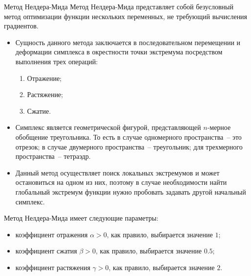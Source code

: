 \documentclass[aspectratio=169, mathserif]{beamer}	%
\begin{document}
\begin{frame}[fragile]{Метод Нелдера-Мида}
\scriptsize
Метод Нелдера-Мида представляет собой безусловный метод оптимизации функции нескольких переменных, не требующий вычисления градиентов.
\begin{itemize}
	\item Сущность данного метода заключается в последовательном перемещении и деформации симплекса в окрестности точки экстремума посредством выполнения трех операций:

\begin{enumerate}
	\scriptsize
	\item Отражение;
	\item Растяжение;
	\item Сжатие.
\end{enumerate}

	\item Симплекс является геометрической фигурой, представляющей $n$-мерное обобщение треугольника. То есть в случае одномерного пространства~-- это отрезок; в случае двумерного пространства~-- треугольник; для трехмерного пространства~-- тетраэдр.
	\item Данный метод осуществляет поиск локальных экстремумов и может остановиться на одном из них, поэтому в случае необходимости найти глобальный экстремум функции нужно пробовать задавать другой начальный симплекс.
\end{itemize}
Метод Нелдера-Мида  имеет следующие параметры:
\begin{itemize}
	\item коэффициент отражения $\alpha > 0$, как правило, выбирается значение $1$;
	\item коэффициент сжатия $\beta > 0$, как правило, выбирается значение $0.5$;
	\item коэффициент растяжения $\gamma > 0$, как правило, выбирается значение $2$.
\end{itemize}
\vfill
\end{frame}
\end{document}
